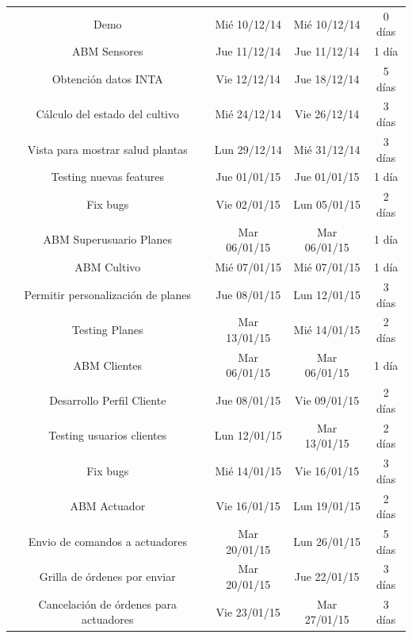 \begin{landscape}
\begin{table}[ht]
\begin{tabular}{c c c c}
Demo                                                        & Mié 10/12/14    & Mié 10/12/14 & 0 días   \\
ABM Sensores                                                & Jue 11/12/14    & Jue 11/12/14 & 1 día    \\
Obtención datos INTA                                        & Vie 12/12/14    & Jue 18/12/14 & 5 días   \\
Cálculo del estado del cultivo                              & Mié 24/12/14    & Vie 26/12/14 & 3 días   \\
Vista para mostrar salud plantas                            & Lun 29/12/14    & Mié 31/12/14 & 3 días   \\
Testing nuevas features                                     & Jue 01/01/15    & Jue 01/01/15 & 1 día    \\
Fix bugs                                                    & Vie 02/01/15    & Lun 05/01/15 & 2 días   \\
ABM Superusuario Planes                                     & Mar 06/01/15    & Mar 06/01/15 & 1 día    \\
ABM Cultivo                                                 & Mié 07/01/15    & Mié 07/01/15 & 1 día    \\
Permitir personalización de planes                          & Jue 08/01/15    & Lun 12/01/15 & 3 días   \\
Testing Planes                                              & Mar 13/01/15    & Mié 14/01/15 & 2 días   \\
ABM Clientes                                                & Mar 06/01/15    & Mar 06/01/15 & 1 día    \\
Desarrollo Perfil Cliente                                   & Jue 08/01/15    & Vie 09/01/15 & 2 días   \\
Testing usuarios clientes                                   & Lun 12/01/15    & Mar 13/01/15 & 2 días   \\
Fix bugs                                                    & Mié 14/01/15    & Vie 16/01/15 & 3 días   \\
ABM Actuador                                                & Vie 16/01/15    & Lun 19/01/15 & 2 días   \\
Envio de comandos a actuadores                              & Mar 20/01/15    & Lun 26/01/15 & 5 días   \\
Grilla de órdenes por enviar                                & Mar 20/01/15    & Jue 22/01/15 & 3 días   \\
Cancelación de órdenes para actuadores                      & Vie 23/01/15    & Mar 27/01/15 & 3 días   \\
\end{tabular}
\end{table}
\end{landscape}

